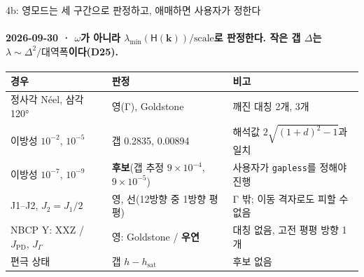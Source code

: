 \begin{frame}[label=stage4b-zero-modes]{4b: 영모드는 세 구간으로 판정하고, 애매하면 사용자가 정한다}
  \framesubtitle{2026-09-30 · $\omega$가 아니라 $\lambda_{\min}(\mathsf H(\mathbf k))/\text{scale}$로 판정한다. 작은 갭 $\Delta$는 $\lambda\sim\Delta^2/\text{대역폭}$이다(D25).}
  \footnotesize\renewcommand{\arraystretch}{1.08}
  \begin{tabularx}{\textwidth}{@{}P{3.3cm}P{3.6cm}Y@{}}
    \toprule
    경우 & 판정 & 비고 \\
    \midrule
    정사각 Néel, 삼각 120° & 영(Γ), Goldstone & 깨진 대칭 2개, 3개 \\
    이방성 $10^{-2}$, $10^{-5}$ & 갭 0.2835, 0.00894 & 해석값 $2\sqrt{(1+d)^2-1}$과 일치 \\
    이방성 $10^{-7}$, $10^{-9}$ & \textbf{후보}(갭 추정 $9\times10^{-4}$, $9\times10^{-5}$) & 사용자가 \texttt{gapless}를 정해야 진행 \\
    J1--J2, $J_2=J_1/2$ & 영, 선(12방향 중 1방향 평평) & Γ 밖; 이동 격자로도 피할 수 없음 \\
    NBCP Y: XXZ / $J_{\mathrm{PD}}$, $J_\Gamma$ & 영: Goldstone / \textbf{우연} & 대칭 없음, 고전 평평 방향 1개 \\
    편극 상태 & 갭 $h-h_{\mathrm{sat}}$ & 후보 없음 \\
    \bottomrule
  \end{tabularx}
  \par\medskip
\end{frame}

